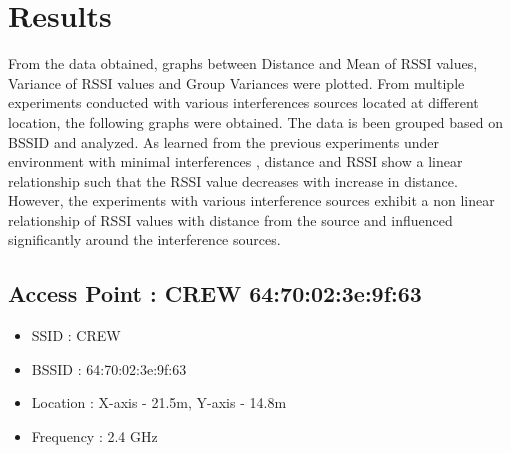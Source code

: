 \documentclass[11pt,a4paper,headinclude,footinclude,chapterprefix=on]{scrreprt}
\begin{document}
\chapter{Results} 
From the data obtained, graphs between Distance and Mean of RSSI values, Variance of RSSI values and Group Variances were plotted. From multiple experiments conducted with various interferences sources located at different location, the following graphs were obtained. The data is been grouped based on BSSID and analyzed. As learned from the previous experiments under environment with minimal interferences \cite{ref:rssi}, distance and RSSI show a linear relationship such that the RSSI value decreases with increase in distance. However, the experiments with various interference sources exhibit a non linear relationship of RSSI values with distance from the source and influenced significantly around the interference sources.

\pagebreak
\section{Access Point : CREW 64:70:02:3e:9f:63} 
\begin{itemize}
	\item SSID : CREW 
	\item BSSID : 64:70:02:3e:9f:63 
	\item Location : X-axis - 21.5m, Y-axis - 14.8m 
	\item Frequency : 2.4 GHz 
\end{itemize}
\end{document}
